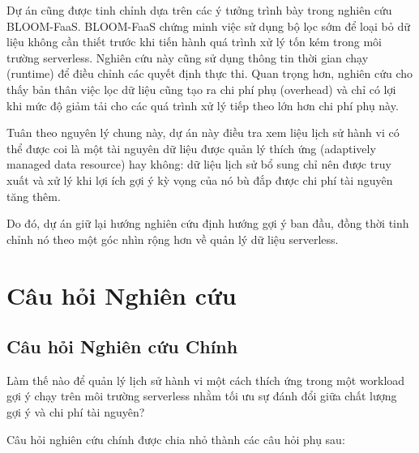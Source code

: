 \documentclass[12pt,a4paper]{article}
\begin{document}
Dự án cũng được tinh chỉnh dựa trên các ý tưởng trình bày trong nghiên cứu BLOOM-FaaS. BLOOM-FaaS chứng minh việc sử dụng bộ lọc sớm để loại bỏ dữ liệu không cần thiết trước khi tiến hành quá trình xử lý tốn kém trong môi trường serverless. Nghiên cứu này cũng sử dụng thông tin thời gian chạy (runtime) để điều chỉnh các quyết định thực thi. Quan trọng hơn, nghiên cứu cho thấy bản thân việc lọc dữ liệu cũng tạo ra chi phí phụ (overhead) và chỉ có lợi khi mức độ giảm tải cho các quá trình xử lý tiếp theo lớn hơn chi phí phụ này.

Tuân theo nguyên lý chung này, dự án này điều tra xem liệu lịch sử hành vi có thể được coi là một tài nguyên dữ liệu được quản lý thích ứng (adaptively managed data resource) hay không: dữ liệu lịch sử bổ sung chỉ nên được truy xuất và xử lý khi lợi ích gợi ý kỳ vọng của nó bù đắp được chi phí tài nguyên tăng thêm.

Do đó, dự án giữ lại hướng nghiên cứu định hướng gợi ý ban đầu, đồng thời tinh chỉnh nó theo một góc nhìn rộng hơn về quản lý dữ liệu serverless.

\section{Câu hỏi Nghiên cứu}

\subsection*{Câu hỏi Nghiên cứu Chính}
Làm thế nào để quản lý lịch sử hành vi một cách thích ứng trong một workload gợi ý chạy trên môi trường serverless nhằm tối ưu sự đánh đổi giữa chất lượng gợi ý và chi phí tài nguyên?

Câu hỏi nghiên cứu chính được chia nhỏ thành các câu hỏi phụ sau:
\end{document}
